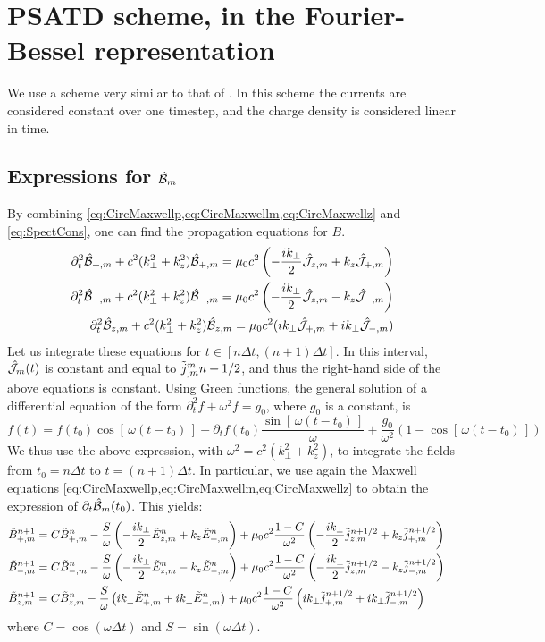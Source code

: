 \section{PSATD scheme, in the Fourier-Bessel
  representation}
\label{sec:PSTADderiv}

We use a scheme very similar to that of \cite{Haber}. In this scheme the currents are considered constant over one timestep, and the charge density is considered linear in time.

\subsection{Expressions for $\hat{\mathcal{B}}_m$}

By combining \cref{eq:CircMaxwellp,eq:CircMaxwellm,eq:CircMaxwellz}
and \cref{eq:SpectCons}, one can find the propagation equations for $B$.
\begin{align*}
\partial_t^2 \hat{\mathcal{B}}_{+,m} + c^2(k_\perp ^2+k_z^2) \hat{\mathcal{B}}_{+,m} = 
\mu_0 c^2 \left( - \frac{ik_\perp }{2} \hat{\mathcal{J}}_{z,m} + k_z \hat{\mathcal{J}}_{+,m}
\right) \\
\partial_t^2 \hat{\mathcal{B}}_{-,m} + c^2(k_\perp ^2+k_z^2) \hat{\mathcal{B}}_{-,m} = 
\mu_0 c^2 \left( - \frac{ik_\perp }{2} \hat{\mathcal{J}}_{z,m} - k_z \hat{\mathcal{J}}_{-,m}
\right) \\
\partial_t^2 \hat{\mathcal{B}}_{z,m} + c^2(k_\perp ^2+k_z^2) \hat{\mathcal{B}}_{z,m} =
\mu_0c^2  (ik_\perp  \hat{\mathcal{J}}_{+,m} + ik_\perp \hat{\mathcal{J}}_{-,m} ) 
\end{align*}
Let us integrate these equations for $t\in [n\Delta t, (n+1)\Delta
t]$. In this interval, $\hat{\mathcal{J}}_m(t)$ is constant
and equal to $\tilde{j}_{_,m}^{m}{n+1/2}$, and thus the right-hand side of the above
equations is constant. Using Green functions, the
general solution of a differential equation of the form 
$\partial_t^2 f + \omega^2 f = g_0$, where $g_0$ is a constant, is 
\[ f(t) = f(t_0) \cos[\,\omega (t-t_0)\,] + \partial_t f (t_0) \frac{
  \sin[\,\omega (t-t_0)\,]  }{\omega} + \frac{g_0}{\omega^2} (1-
\cos[\,\omega (t-t_0)\,] ) \]  
We thus use the above expression, with $\omega^2 =c^2(k_\perp^2 +
k_z^2)$, to integrate the fields from $t_0 = n\Delta t$ to $t=(n+1)\Delta t$. In
particular, we use again the Maxwell equations
\cref{eq:CircMaxwellp,eq:CircMaxwellm,eq:CircMaxwellz} to obtain the
expression of $\partial_t \hat{\mathcal{B}}_{m} (t_0)$. This yields:
\begin{align*}
\tilde{B}_{+,m}^{n+1} = \; & C \tilde{B}_{+,m}^{n} - 
\frac{S}{\omega}\left(-\frac{ik_\perp }{2} \tilde{E}_{z,m}^{n} + k_z\tilde{E}_{+,m}^{n}
\right) + \mu_0 c^2\frac{1-C}{\omega^2} \left( -\frac{ik_\perp }{2}
  \tilde{j}_{z,m}^{n+1/2} + k_z \tilde{j}_{+,m}^{n+1/2} \right)& \\
\tilde{B}_{-,m}^{n+1} =\; & C \tilde{B}_{-,m}^{n} - 
\frac{S}{\omega}\left(- \frac{ik_\perp }{2} \tilde{E}_{z,m}^{n} - k_z\tilde{E}_{-,m}^{n}
\right) + \mu_0 c^2\frac{1-C}{\omega^2} \left( - \frac{ik_\perp }{2}
  \tilde{j}_{z,m}^{n+1/2} - k_z \tilde{j}_{-,m}^{n+1/2} \right) &\\
\tilde{B}_{z,m}^{n+1} =\; & C \tilde{B}_{z,m}^{n} - 
\frac{S}{\omega}\left(ik_\perp \tilde{E}_{+,m}^{n} + ik_\perp \tilde{E}_{-,m}^{n}
\right) + \mu_0 c^2\frac{1-C}{\omega^2} \left( ik_\perp
  \tilde{j}_{+,m}^{n+1/2} + ik_\perp \tilde{j}_{-,m}^{n+1/2} \right)&
\end{align*}
where $C = \cos(\omega \Delta t)$ and $S = \sin(\omega \Delta t) $.

